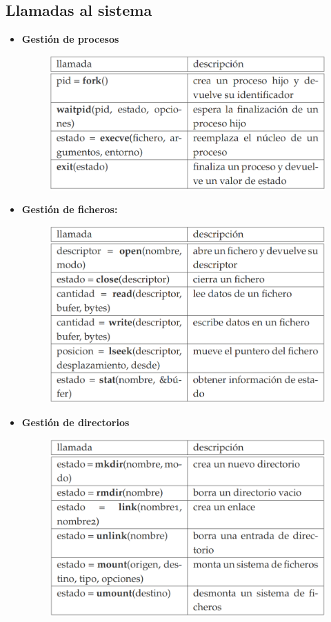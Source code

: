 \documentclass{article}
\begin{document}
\subsection{Llamadas al sistema}
\begin{itemize}
\item \textbf{Gestión de procesos}

\begin{figure}[h]
\centering
\includegraphics[scale=1, width=\textwidth]{llamadas_1.png}
\end{figure}
\newpage

\item \textbf{Gestión de ficheros:}

\begin{figure}[h]
\centering
\includegraphics[scale=1, width=110mm]{llamadas_2.png}
\end{figure}

\item \textbf{Gestión de directorios}
\begin{figure}[h]
\centering
\includegraphics[scale=1, width=110mm]{llamadas_3.png}
\end{figure}
\newpage


\end{itemize}
\end{document}
